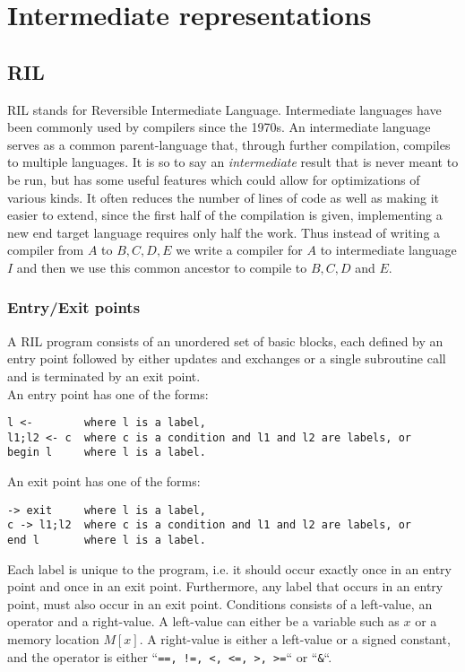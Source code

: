 \section{Intermediate representations}
\label{section - RIL}
\subsection{RIL}
RIL stands for Reversible Intermediate Language.
Intermediate languages have been commonly used by compilers since the 1970s.
An intermediate language serves as a common parent-language that, through further compilation, compiles to multiple languages.
It is so to say an \emph{intermediate} result that is never meant to be run, but has some useful features which could allow for optimizations of various kinds.
It often reduces the number of lines of code as well as making it easier to extend, since the first half of the compilation is given, implementing a new end target language requires only half the work.
Thus instead of writing a compiler from $A$ to $B,C,D,E$ we write a compiler for $A$ to intermediate language $I$ and then we use this common ancestor to compile to $B, C, D$ and $E$.
\subsubsection{Entry/Exit points}
A RIL program consists of an unordered set of basic blocks, each defined by an entry point followed by either updates and exchanges or a single subroutine call and is terminated by an exit point\cite{10.1007/978-3-319-41579-6_16}. \\
An entry point has one of the forms:
\begin{verbatim}
l <-        where l is a label,
l1;l2 <- c  where c is a condition and l1 and l2 are labels, or
begin l     where l is a label.
\end{verbatim}
An exit point has one of the forms:
\begin{verbatim}
-> exit     where l is a label,
c -> l1;l2  where c is a condition and l1 and l2 are labels, or
end l       where l is a label.
\end{verbatim}

Each label is unique to the program, i.e. it should occur exactly once in an entry point and once in an exit point.
Furthermore, any label that occurs in an entry point, must also occur in an exit point.
Conditions consists of a left-value, an operator and a right-value.
A left-value can either be a variable such as $x$ or a memory location $M[x]$.
A right-value is either a left-value or a signed constant, and the operator is either ``\lstinline{==, !=, <, <=, >, >=}`` or ``\lstinline{&}``.

